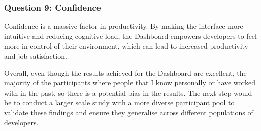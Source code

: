 \subsubsection{Question 9: Confidence}
Confidence is a massive factor in productivity. By making the interface more intuitive and reducing cognitive load, the Dashboard empowers developers to
feel more in control of their environment, which can lead to increased productivity and job satisfaction.

Overall, even though the results achieved for the Dashboard are excellent, the majority of the participants where people that I know personally or have worked with 
in the past, so there is a potential bias in the results. The next step would be to conduct a larger scale study with a more diverse participant pool to validate 
these findings and ensure they generalise across different populations of developers.

